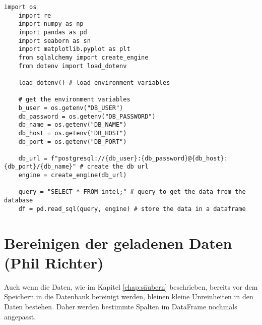 \lstset{
	breaklines=true,         %
	breakatwhitespace=false, %
	basicstyle=\ttfamily,    %
}

\begin{lstlisting}[caption={\texttt{load data from the database}},captionpos=b]
    import os
    import re
    import numpy as np
    import pandas as pd
    import seaborn as sn
    import matplotlib.pyplot as plt
    from sqlalchemy import create_engine
    from dotenv import load_dotenv

    load_dotenv() # load environment variables

    # get the environment variables
    b_user = os.getenv("DB_USER")
    db_password = os.getenv("DB_PASSWORD")
    db_name = os.getenv("DB_NAME")
    db_host = os.getenv("DB_HOST")
    db_port = os.getenv("DB_PORT")

    db_url = f"postgresql://{db_user}:{db_password}@{db_host}:{db_port}/{db_name}" # create the db url
    engine = create_engine(db_url)

    query = "SELECT * FROM intel;" # query to get the data from the database
    df = pd.read_sql(query, engine) # store the data in a dataframe
\end{lstlisting}

\section{Bereinigen der geladenen Daten (Phil Richter)}\label{sec:bereinigen}
Auch wenn die Daten, wie im Kapitel \ref{chap:säubern} beschrieben, bereits vor dem Speichern in die Datenbank bereinigt werden, bleinen kleine
Unreinheiten in den Daten bestehen. Daher werden bestimmte Spalten im DataFrame nochmals angepasst.

